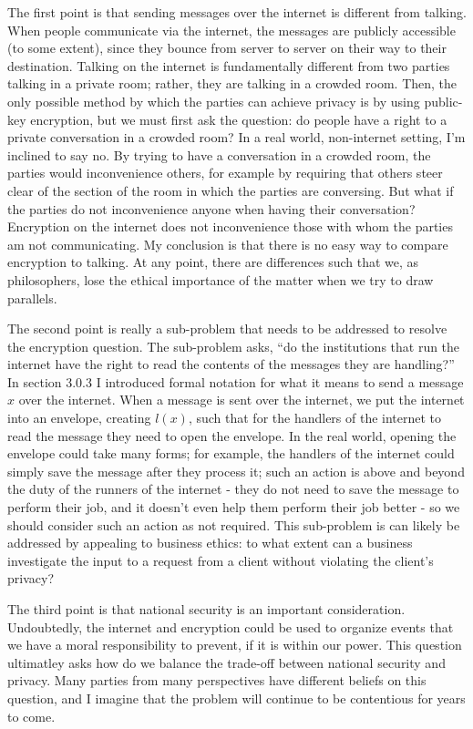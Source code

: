 \documentclass[11pt]{article}
\begin{document}
The first point is that sending messages over the internet is different from talking.
When people communicate via the internet, the messages are publicly accessible (to some extent), since they bounce from server to server on their way to their destination.
Talking on the internet is fundamentally different from two parties talking in a private room; rather, they are talking in a crowded room.
Then, the only possible method by which the parties can achieve privacy is by using public-key encryption, but we must first ask the question: do people have a right to a private conversation in a crowded room? 
In a real world, non-internet setting, I'm inclined to say no. 
By trying to have a conversation in a crowded room, the parties would inconvenience others, for example by requiring that others steer clear of the section of the room in which the parties are conversing.
But what if the parties do not inconvenience anyone when having their conversation?
Encryption on the internet does not inconvenience those with whom the parties am not communicating.
My conclusion is that there is no easy way to compare encryption to talking.
At any point, there are differences such that we, as philosophers, lose the ethical importance of the matter when we try to draw parallels.

The second point is really a sub-problem that needs to be addressed to resolve the encryption question.
The sub-problem asks, ``do the institutions that run the internet have the right to read the contents of the messages they are handling?''
In section 3.0.3 I introduced formal notation for what it means to send a message $x$ over the internet.
When a message is sent over the internet, we put the internet into an envelope, creating $l(x)$, such that for the handlers of the internet to read the message they need to open the envelope.
In the real world, opening the envelope could take many forms; for example, the handlers of the internet could simply save the message after they process it; such an action is above and beyond the duty of the runners of the internet - they do not need to save the message to perform their job, and it doesn't even help them perform their job better - so we should consider such an action as not required.
This sub-problem is can likely be addressed by appealing to business ethics: to what extent can a business investigate the input to a request from a client without violating the client's privacy?

The third point is that national security is an important consideration.
Undoubtedly, the internet and encryption could be used to organize events that we have a moral responsibility to prevent, if it is within our power.
This question ultimatley asks how do we balance the trade-off between national security and privacy.
Many parties from many perspectives have different beliefs on this question, and I imagine that the problem will continue to be contentious for years to come. 
\end{document}
